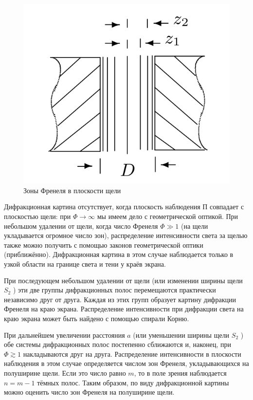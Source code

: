 \documentclass[a5paper,10pt, twoside]{article} %
\begin{document}
	\begin{figure} %
		\label{img:zones}
		\includegraphics[width=\linewidth]{zones.png}
		\caption{Зоны Френеля в	плоскости щели}
	\end{figure}

	Дифракционная картина отсутствует, когда плоскость наблюдения $\text{П}$ совпадает с плоскостью
	щели: при $\Phi \rightarrow \infty$ мы имеем дело с геометрической оптикой. При небольшом
	удалении от щели, когда число Френеля $\Phi \gg 1$ (на щели укладывается огромное число зон),
	распределение интенсивности света за щелью также можно получить с помощью законов геометрической
	оптики (приближённо). Дифракционная картина в этом случае наблюдается только в узкой области на
	границе света и тени у краёв экрана.

	При последующем небольшом удалении от щели (или изменении ширины щели $S_2$ ) эти две группы
	дифракционных полос перемещаются практически независимо друг от друга. Каждая из этих групп
	образует картину дифракции Френеля на краю экрана. Распределение интенсивности при дифракции
	света на краю экрана может быть найдено с помощью спирали Корню.


	При дальнейшем увеличении расстояния $a$ (или уменьшении ширины	щели $S_2$ ) обе системы
	дифракционных полос постепенно сближаются и, наконец, при $\Phi \gtrsim 1$ накладываются друг на
	друга. Распределение интенсивности в плоскости наблюдения в этом случае определяется числом
	зон Френеля, укладывающихся на полуширине щели. Если это число равно $m$, то в поле зрения
	наблюдается $n = m - 1$ тёмных полос. Таким образом, по виду дифракционной картины можно оценить число
	зон Френеля на полуширине щели.
	
\end{document}
